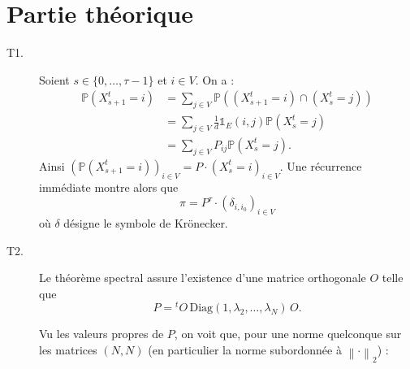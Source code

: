 \documentclass[11pt]{article}
\renewcommand{\P}{\mathbb{P}}
\newcommand{\ind}{\mathds{1}}
\begin{document}
\section{Partie théorique}
\begin{description}
    \item[T1.\label{q:t1}] Soient $s \in \{0, \ldots, \tau - 1\}$ et $i \in V$. On a :
    \begin{align*}
    \P(X_{s+1}^{t} = i) & = \sum_{j \in V} \P((X_{s+1}^{t} = i) \cap (X_{s}^{t} = j))\\
    & = \sum_{j \in V}  \frac{1}{d}\ind_{E}(i,j) \P (X_{s}^{t} = j)\\
    & = \sum_{j \in V} P_{ij}\P (X_{s}^{t} = j).
    \end{align*}
    Ainsi $\left(\P(X_{s+1}^{t} = i)\right)_{i \in V} = P \cdot (X_{s}^{t} = i)_{i \in V}$. Une récurrence immédiate montre alors que
    \begin{equation}\label{eq:t1}
    \pi = P^{\tau} \cdot (\delta_{i,i_0})_{i \in V}
    \end{equation}
    où $\delta$ désigne le symbole de Krönecker.

    \item[T2.\label{q:t2}] Le théorème spectral assure l'existence d'une matrice orthogonale $O$ telle que
    \begin{equation*}\label{eq:diagonalisation}
    P = {}^{t}O \,\mathrm{Diag}(1,\lambda_2, \ldots, \lambda_N)\, O.
    \end{equation*}
     
    Vu les valeurs propres de $P$, on voit que, pour une norme quelconque sur les matrices $(N,N)$ (en particulier la norme subordonnée à $\left\lVert \cdot \right\rVert_2$) :
    

\end{description}
\end{document}
